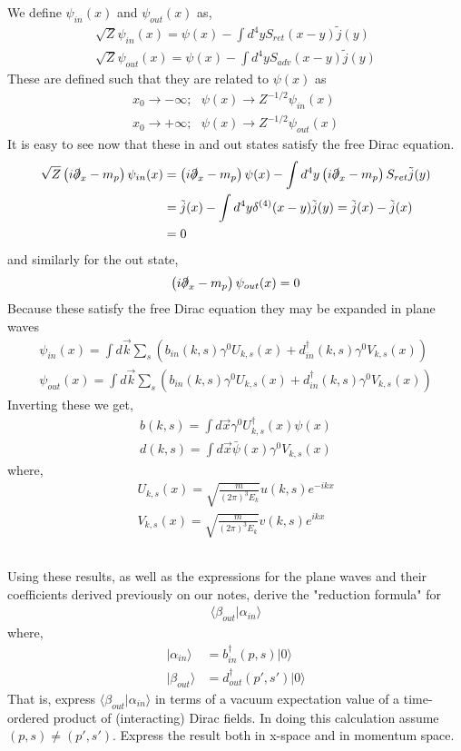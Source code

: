 \documentclass{article}
\numberwithin{equation}{section}
\newcommand{\direq}[2]{\left(i \slashed{\partial}_{#1} - m_p  \right) #2}
\newcommand{\px}{\psi(x)}
\newcommand{\pxb}{\bar{\psi}(x)}
\newcommand{\pinx}{\psi_{in}(x)}
\newcommand{\poutx}{\psi_{out}(x)}
\newcommand{\beq}[1]{\begin{equation} \begin{aligned} #1 \end{aligned} \end{equation}}
\newcommand{\sr}{S_{ret}}
\newcommand{\sa}{S_{adv}}
\newcommand{\sqz}{\sqrt{Z}}
\newcommand{\intdtx}{\int d \vec{x}}
\newcommand{\intdfy}{\int d^4 y}
\newcommand{\bkt}[2]{\langle #1| #2  \rangle}
\newcommand{\bout}{\beta_{out}}
\newcommand{\ain}{\alpha_{in}}
\begin{document}
We define $\pinx$ and $\poutx$ as,
\beq{
   \sqz \pinx = \px - \intdfy \sr(x-y) \tilde{j}(y) \\
   \sqz \poutx = \px - \intdfy \sa(x-y) \tilde{j}(y) 
}
These are defined such that they are related to $\px$ as
\beq{ \label{limits}
    x_0 \rightarrow -\infty; \text{  } \px \rightarrow Z^{-1/2} \pinx \\
    x_0 \rightarrow +\infty; \text{  } \px \rightarrow Z^{-1/2} \poutx
}
It is easy to see now that these in and out states satisfy the free Dirac equation.
\beq{
    \sqz \direq{x}{\pinx} &= \direq{x}{\px} - \intdfy \direq{x}{\sr} \tilde{j}(y) \\
        &= \tilde{j}(x) - \intdfy \delta^{(4)}(x-y) \tilde{j}(y) = \tilde{j}(x) - \tilde{j}(x) \\
        &=0
}
and similarly for the out state,
\beq{
    \direq{x}{\poutx} = 0
}
Because these satisfy the free Dirac equation they may be expanded in plane waves
\beq{
    \pinx = \int d \vec{k} \sum_{s} \left( b_{in}(k,s) \gamma^0 U_{k,s}(x) + d_{in}^{\dagger} (k,s) \gamma^0 V_{k,s}(x) \right)  \\
    \poutx = \int d \vec{k} \sum_{s} \left( b_{in}(k,s) \gamma^0 U_{k,s}(x) + d_{in}^{\dagger} (k,s) \gamma^0 V_{k,s}(x) \right)  
}
Inverting these we get,
\beq{ \label{ops}
    b(k,s) = \intdtx \gamma^0 U^{\dagger}_{k,s}(x) \px \\
    d(k,s) = \intdtx \pxb \gamma^0 V_{k,s}(x)
}
where,
\beq{ \label{coef}
    U_{k,s}(x) = \sqrt{\frac{m}{(2\pi)^3 E_k}} u(k,s) e^{-ikx} \\
    V_{k,s}(x) = \sqrt{\frac{m}{(2\pi)^3 E_k}} v(k,s) e^{ikx}
}
\subsection{}
Using these results, as well as the expressions for the plane waves and their coefficients derived previously on our notes, derive the "reduction formula" for
\beq{
    \bkt{\bout}{\ain}    
}
where,
\beq{
    |\ain \rangle &= b^{\dagger}_{in} (p,s) |0 \rangle \\
    |\bout \rangle &= d^{\dagger}_{out}(p',s') |0 \rangle
}
That is, express $\bkt{\bout}{\ain}$ in terms of a vacuum expectation value of a time-ordered product of (interacting) Dirac fields. In doing this calculation
assume $(p,s) \neq (p',s')$. Express the result both in x-space and in momentum space.
\end{document}
